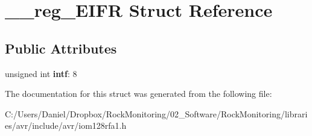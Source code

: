 \hypertarget{struct____reg___e_i_f_r}{}\section{\+\_\+\+\_\+reg\+\_\+\+E\+I\+FR Struct Reference}
\label{struct____reg___e_i_f_r}
\subsection*{Public Attributes}
\begin{DoxyCompactItemize}
\item 
unsigned int {\bfseries intf}\+: 8\hypertarget{struct____reg___e_i_f_r_a873801cb366f45679760a4df501b47bd}{}\label{struct____reg___e_i_f_r_a873801cb366f45679760a4df501b47bd}

\end{DoxyCompactItemize}


The documentation for this struct was generated from the following file\+:\begin{DoxyCompactItemize}
\item 
C\+:/\+Users/\+Daniel/\+Dropbox/\+Rock\+Monitoring/02\+\_\+\+Software/\+Rock\+Monitoring/libraries/avr/include/avr/iom128rfa1.\+h\end{DoxyCompactItemize}
